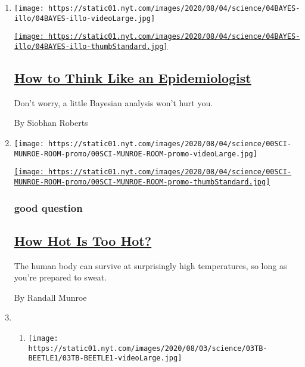 \begin{enumerate}
\def\labelenumi{\arabic{enumi}.}
\item
  \texttt{[image: https://static01.nyt.com/images/2020/08/04/science/04BAYES-illo/04BAYES-illo-videoLarge.jpg]}

  \href{/2020/08/04/science/coronavirus-bayes-statistics-math.html}{\texttt{[image: https://static01.nyt.com/images/2020/08/04/science/04BAYES-illo/04BAYES-illo-thumbStandard.jpg]}}

  \hypertarget{how-to-think-like-an-epidemiologist}{%
  \subsection{\texorpdfstring{\href{/2020/08/04/science/coronavirus-bayes-statistics-math.html}{How
  to Think Like an
  Epidemiologist}}{How to Think Like an Epidemiologist}}\label{how-to-think-like-an-epidemiologist}}

  Don't worry, a little Bayesian analysis won't hurt you.

  By Siobhan Roberts
\item
  \texttt{[image: https://static01.nyt.com/images/2020/08/04/science/00SCI-MUNROE-ROOM-promo/00SCI-MUNROE-ROOM-promo-videoLarge.jpg]}

  \href{/2020/08/04/science/randall-munroe-xkcd-temperature.html}{\texttt{[image: https://static01.nyt.com/images/2020/08/04/science/00SCI-MUNROE-ROOM-promo/00SCI-MUNROE-ROOM-promo-thumbStandard.jpg]}}

  \hypertarget{good-question}{%
  \subsubsection{good question}\label{good-question}}

  \hypertarget{how-hot-is-too-hot}{%
  \subsection{\texorpdfstring{\href{/2020/08/04/science/randall-munroe-xkcd-temperature.html}{How
  Hot Is Too Hot?}}{How Hot Is Too Hot?}}\label{how-hot-is-too-hot}}

  The human body can survive at surprisingly high temperatures, so long
  as you're prepared to sweat.

  By Randall Munroe
\item
  \begin{enumerate}
  \def\labelenumii{\arabic{enumii}.}
  \item
    \texttt{[image: https://static01.nyt.com/images/2020/08/03/science/03TB-BEETLE1/03TB-BEETLE1-videoLarge.jpg]}


\end{enumerate}
\end{enumerate}
